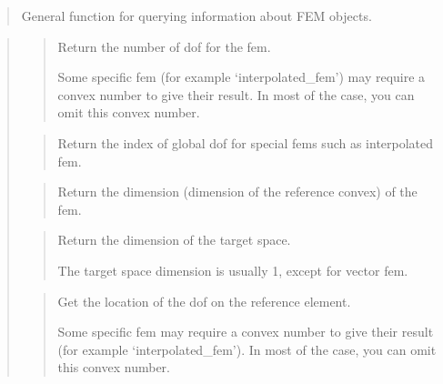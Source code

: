 \documentclass[a4paper,11pt,english]{sphinxmanual}
\begin{document}
\begin{quote}

General function for querying information about FEM objects.
\end{quote}

\begin{quote}

\begin{quote}

Return the number of dof for the fem.

Some specific fem (for example ‘interpolated\_fem’) may require a
convex number  to give their result. In most of the case, you
can omit this convex number.
\end{quote}

\begin{quote}

Return the index of global dof for special fems such as interpolated fem.
\end{quote}

\begin{quote}

Return the dimension (dimension of the reference convex) of the fem.
\end{quote}

\begin{quote}

Return the dimension of the target space.

The target space dimension is usually 1, except for vector fem.
\end{quote}

\begin{quote}

Get the location of the dof on the reference element.

Some specific fem may require a convex number  to give their
result (for example ‘interpolated\_fem’). In most of the case, you
can omit this convex number.
\end{quote}


\end{quote}
\end{document}
